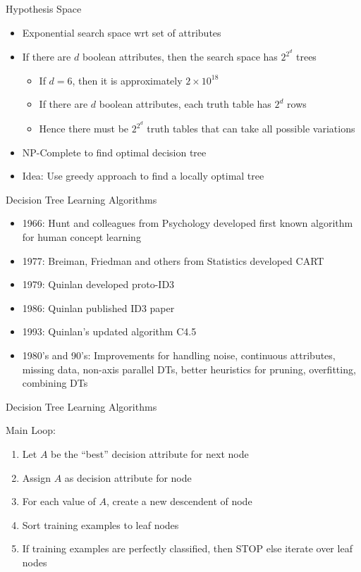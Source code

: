 \documentclass{beamer}
\begin{document}
\begin{frame}{Hypothesis Space}
    \begin{itemize}
        \item Exponential search space wrt set of attributes
        \item If there are $d$ boolean attributes, then the search space has $2^{2^d}$ trees
        \begin{itemize}
            \item If $d=6$, then it is approximately $2 \times 10^{18}$
            \item If there are $d$ boolean attributes, each truth table has $2^d$ rows
            \item Hence there must be $2^{2^d}$ truth tables that can take all possible variations 
        \end{itemize}
        \item NP-Complete to find optimal decision tree
        \item Idea: Use greedy approach to find a locally optimal tree
    \end{itemize}
\end{frame}

\begin{frame}{Decision Tree Learning Algorithms}
    \begin{itemize}
        \item 1966: Hunt and colleagues from Psychology developed first known algorithm for human concept learning
        \item 1977: Breiman, Friedman and others from Statistics developed CART
        \item 1979: Quinlan developed proto-ID3
        \item 1986: Quinlan published ID3 paper
        \item 1993: Quinlan's updated algorithm C4.5
        \item 1980's and 90's: Improvements for handling noise, continuous attributes, missing data, non-axis parallel DTs, better heuristics for pruning, overfitting, combining DTs
    \end{itemize}
\end{frame}

\begin{frame}{Decision Tree Learning Algorithms}
    
    Main Loop:
    \begin{enumerate}
        \item Let $A$ be the ``best'' decision attribute for next node
        \item Assign $A$ as decision attribute for node
        \item For each value of $A$, create a new descendent of node
        \item Sort training examples to leaf nodes
        \item If training examples are perfectly classified, then STOP else iterate over leaf nodes
    \end{enumerate}
\end{frame}
\end{document}
